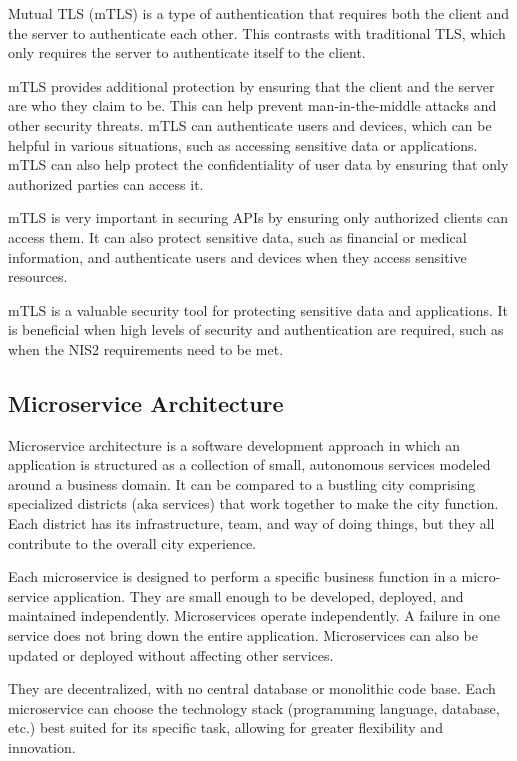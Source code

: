 Mutual TLS (mTLS) is a type of authentication that requires both the
client and the server to authenticate each other. This contrasts with
traditional TLS, which only requires the server to authenticate itself
to the client.

mTLS provides additional protection by ensuring that the client and the
server are who they claim to be. This can help prevent man-in-the-middle
attacks and other security threats. mTLS can authenticate users and
devices, which can be helpful in various situations, such as accessing
sensitive data or applications. mTLS can also help protect the
confidentiality of user data by ensuring that only authorized parties
can access it.

mTLS is very important in securing APIs by ensuring only authorized
clients can access them. It can also protect sensitive data, such as
financial or medical information, and authenticate users and devices
when they access sensitive resources.

mTLS is a valuable security tool for protecting sensitive data and
applications. It is beneficial when high levels of security and
authentication are required, such as when the NIS2 requirements need to
be met.

\subsection{Microservice Architecture}

Microservice architecture is a software development approach in which an
application is structured as a collection of small, autonomous services
modeled around a business domain. It can be compared to a bustling city
comprising specialized districts (aka services) that work together to
make the city function. Each district has its infrastructure, team, and
way of doing things, but they all contribute to the overall city
experience.

Each microservice is designed to perform a specific business function in
a micro-service application. They are small enough to be developed,
deployed, and maintained independently. Microservices operate
independently. A failure in one service does not bring down the entire
application. Microservices can also be updated or deployed without
affecting other services.

They are decentralized, with no central database or monolithic code
base. Each microservice can choose the technology stack (programming
language, database, etc.) best suited for its specific task, allowing
for greater flexibility and innovation.

